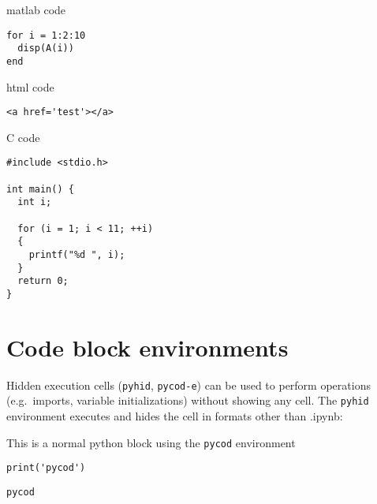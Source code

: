 \documentclass[%
oneside,                 %
final,                   %
chapterprefix=true,      %
open=right,              %
10pt]{book}
\begin{document}
matlab code




\begin{Verbatim}[numbers=none,fontsize=\fontsize{9pt}{9pt},baselinestretch=0.95]
for i = 1:2:10
  disp(A(i))
end

\end{Verbatim}


html code


\begin{Verbatim}[numbers=none,fontsize=\fontsize{9pt}{9pt},baselinestretch=0.95]
<a href='test'></a>

\end{Verbatim}


C code












\begin{Verbatim}[numbers=none,fontsize=\fontsize{9pt}{9pt},baselinestretch=0.95]
#include <stdio.h>

int main() {
  int i;

  for (i = 1; i < 11; ++i)
  {
    printf("%d ", i);
  }
  return 0;
}

\end{Verbatim}


\section{Code block environments}

Hidden execution cells (\texttt{pyhid}, \texttt{pycod-e}) can be used to perform operations (e.g.~imports, variable initializations) without showing any cell.  
The \texttt{pyhid} environment executes and hides the cell in formats other than .ipynb:

This is a normal python block using the \texttt{pycod} environment


\begin{Verbatim}[numbers=none,fontsize=\fontsize{9pt}{9pt},baselinestretch=0.95]
print('pycod')

\end{Verbatim}

\begin{Verbatim}[numbers=none,fontsize=\fontsize{9pt}{9pt},baselinestretch=0.95]
pycod
\end{Verbatim}
\end{document}
